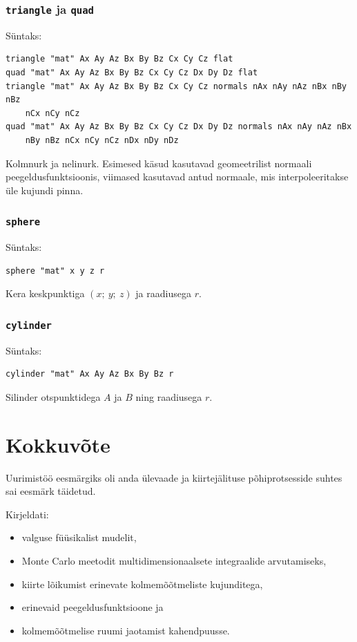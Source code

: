 \documentclass[a4paper,12pt]{report}
\begin{document}
\subsection{\texttt{triangle} ja \texttt{quad}}
Süntaks:
\begin{verbatim}
triangle "mat" Ax Ay Az Bx By Bz Cx Cy Cz flat
quad "mat" Ax Ay Az Bx By Bz Cx Cy Cz Dx Dy Dz flat
triangle "mat" Ax Ay Az Bx By Bz Cx Cy Cz normals nAx nAy nAz nBx nBy nBz
	nCx nCy nCz
quad "mat" Ax Ay Az Bx By Bz Cx Cy Cz Dx Dy Dz normals nAx nAy nAz nBx
	nBy nBz nCx nCy nCz nDx nDy nDz
\end{verbatim}

Kolmnurk ja nelinurk. Esimesed käsud kasutavad geomeetrilist normaali
peegeldusfunktsioonis, viimased kasutavad antud normaale, mis interpoleeritakse
üle kujundi pinna.

\subsection{\texttt{sphere}}
Süntaks:
\begin{verbatim}
sphere "mat" x y z r
\end{verbatim}

Kera keskpunktiga \((x;~y;~{}z)\) ja raadiusega \(r\).

\subsection{\texttt{cylinder}}
Süntaks:
\begin{verbatim}
cylinder "mat" Ax Ay Az Bx By Bz r
\end{verbatim}

Silinder otspunktidega \(A\) ja \(B\) ning raadiusega \(r\).

\chapter*{Kokkuvõte}
Uurimistöö eesmärgiks oli anda ülevaade ja kiirtejälituse põhiprotsesside
suhtes sai ees\-märk täidetud. 

Kirjeldati:
\begin{itemize}
\item valguse füüsikalist mudelit,
\item Monte Carlo meetodit multidimensionaalsete integraalide arvutamiseks,
\item kiirte lõikumist erinevate kolmemõõtmeliste kujunditega,
\item erinevaid peegeldusfunktsioone ja
\item kolmemõõtmelise ruumi jaotamist kahendpuusse.
\end{itemize}
\end{document}
